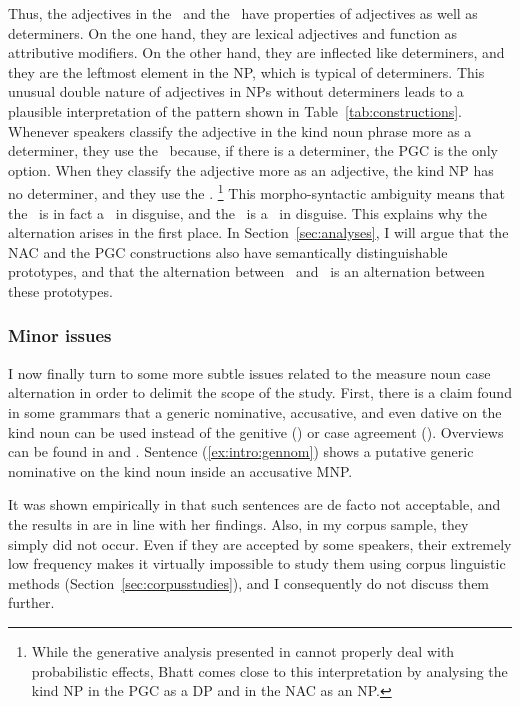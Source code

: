 Thus, the adjectives in the \NACa\ and the \PGCa\ have properties of adjectives as well as determiners.
On the one hand, they are lexical adjectives and function as attributive modifiers.
On the other hand, they are inflected like determiners, and they are the leftmost element in the NP, which is typical of determiners.
This unusual double nature of adjectives in NPs without determiners leads to a plausible interpretation of the pattern shown in Table~\ref{tab:constructions}.
Whenever speakers classify the adjective in the kind noun phrase more as a determiner, they use the \PGCa\ because, if there is a determiner, the PGC is the only option.
When they classify the adjective more as an adjective, the kind NP has no determiner, and they use the \NACa.%
\footnote{While the generative analysis presented in \cite{Bhatt1990} cannot properly deal with probabilistic effects, Bhatt comes close to this interpretation by analysing the kind NP in the PGC as a DP and in the NAC as an NP.}
This morpho-syntactic ambiguity means that the \NACa\ is in fact a \NACb\ in disguise, and the \PGCa\ is a \PGCd\ in disguise.
This explains why the alternation arises in the first place.
In Section~\ref{sec:analyses}, I will argue that the NAC and the PGC constructions also have semantically distinguishable prototypes, and that the alternation between \PGCa\ and \NACa\ is an alternation between these prototypes.

\subsubsection{Minor issues}
\label{sec:neighbouringcases}

I now finally turn to some more subtle issues related to the measure noun case alternation in order to delimit the scope of the study.
First, there is a claim found in some grammars that a generic nominative, accusative, and even dative on the kind noun can be used instead of the genitive (\PGCa) or case agreement (\NACa).
Overviews can be found in \cite{Hentschel1993} and \cite{Zimmer2015}.
Sentence (\ref{ex:intro:gennom}) shows a putative generic nominative on the kind noun inside an accusative MNP.

\begin{exe}
\end{exe}

It was shown empirically in \cite{Hentschel1993} that such sentences are de facto not acceptable, and the results in \citet{Zimmer2015} are in line with her findings.
Also, in my corpus sample, they simply did not occur.
Even if they are accepted by some speakers, their extremely low frequency makes it virtually impossible to study them using corpus linguistic methods (Section~\ref{sec:corpusstudies}), and I consequently do not discuss them further.

